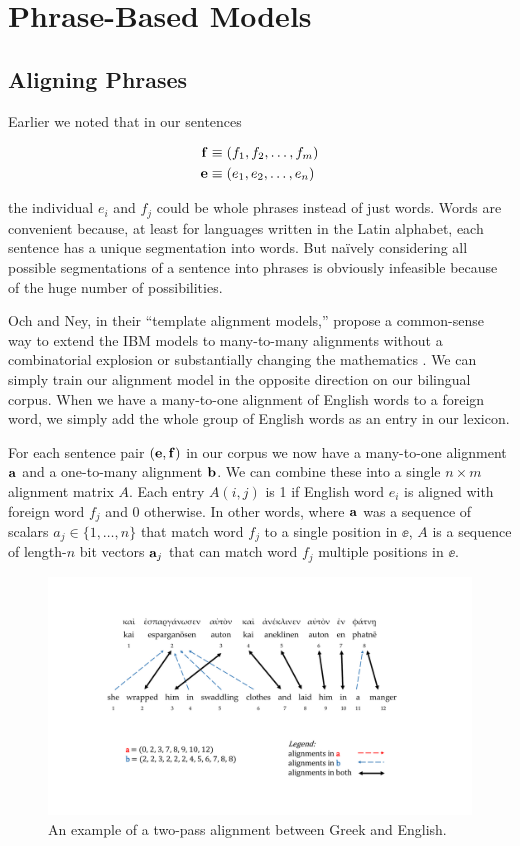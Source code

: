 \documentclass[11pt]{article}
\begin{document}
\section{Phrase-Based Models}
\subsection{Aligning Phrases}
Earlier we noted that in our sentences

\begin{align*}
    \ff &\equiv (f_1, f_2, \dotsc, f_m) \\
    \ee &\equiv (e_1, e_2, \dotsc, e_n) \\
\end{align*}

the individual $e_i$ and $f_j$ could be whole phrases instead of just words. 
Words are convenient because, at least for languages written in the Latin alphabet,
each sentence has a unique segmentation into words. 
But na\"{i}vely considering all possible segmentations of a sentence into phrases is obviously infeasible
because of the huge number of possibilities.

Och and Ney, in their ``template alignment models,'' propose a common-sense way to extend the IBM models to many-to-many alignments
without a combinatorial explosion or substantially changing the mathematics  \cite{och:99}. 
We can simply train our alignment model in the opposite direction 
on our bilingual corpus. When we have a many-to-one alignment of English words to a foreign word, we simply
add the whole group of English words as an entry in our lexicon. 

For each sentence pair $(\ee, \ff)$ in our corpus we now have a many-to-one alignment $\aa$ and a
one-to-many alignment $\bb$.
We can combine these into a single $n \times m$ alignment matrix $A$.
Each entry $A(i,j)$ is 1 if English word $e_i$ is aligned with foreign word $f_j$ and 0 otherwise.
In other words, where $\aa$ was a sequence of scalars $a_j \in \{1, \dotsc, n\}$ that match word $f_j$ to a single position in $\ee$,
$A$ is a sequence of length-$n$ bit vectors $\aa_j$ that can match word $f_j$ multiple positions in $\ee$.

\begin{figure}
\centering
\includegraphics[scale=0.5]{phrase_align.pdf}
\caption{An example of a two-pass alignment between Greek and English.}
\label{phrase_align}
\end{figure}
\end{document}
